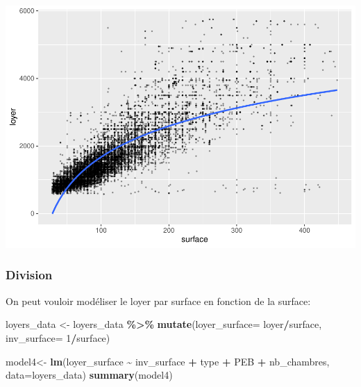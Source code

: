 \documentclass[
]{book}
\newenvironment{Shaded}{\begin{snugshade}}{\end{snugshade}}
\newcommand{\AttributeTok}[1]{\textcolor[rgb]{0.13,0.29,0.53}{#1}}
\newcommand{\DecValTok}[1]{\textcolor[rgb]{0.00,0.00,0.81}{#1}}
\newcommand{\FunctionTok}[1]{\textcolor[rgb]{0.13,0.29,0.53}{\textbf{#1}}}
\newcommand{\NormalTok}[1]{#1}
\newcommand{\OtherTok}[1]{\textcolor[rgb]{0.56,0.35,0.01}{#1}}
\newcommand{\SpecialCharTok}[1]{\textcolor[rgb]{0.81,0.36,0.00}{\textbf{#1}}}
\begin{document}
\includegraphics{manuel_geo_quanti_files/figure-latex/unnamed-chunk-13-1.pdf}

\hypertarget{division}{%
\subsubsection{Division}\label{division}}

On peut vouloir modéliser le loyer par surface en fonction de la
surface:

\begin{Shaded}
\begin{Highlighting}[]
\NormalTok{loyers\_data }\OtherTok{\textless{}{-}}\NormalTok{ loyers\_data }\SpecialCharTok{\%\textgreater{}\%}
  \FunctionTok{mutate}\NormalTok{(}\AttributeTok{loyer\_surface=}\NormalTok{ loyer}\SpecialCharTok{/}\NormalTok{surface,}
         \AttributeTok{inv\_surface=} \DecValTok{1}\SpecialCharTok{/}\NormalTok{surface)}

\NormalTok{model4}\OtherTok{\textless{}{-}} \FunctionTok{lm}\NormalTok{(loyer\_surface }\SpecialCharTok{\textasciitilde{}}\NormalTok{ inv\_surface }\SpecialCharTok{+}\NormalTok{  type }\SpecialCharTok{+}\NormalTok{ PEB }\SpecialCharTok{+}\NormalTok{ nb\_chambres, }\AttributeTok{data=}\NormalTok{loyers\_data)}
\FunctionTok{summary}\NormalTok{(model4)}
\end{Highlighting}
\end{Shaded}
\end{document}
